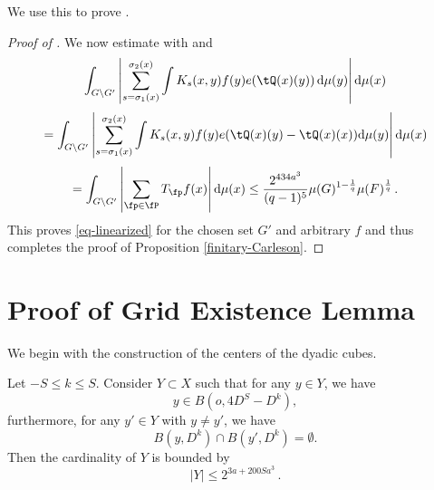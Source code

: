 We use this to prove .
\begin{proof}[Proof of ]
\leanok
We now estimate with  and 
\begin{equation}
 \int_{G \setminus G'} \left|\sum_{s={\sigma_1}(x)}^{{\sigma_2}(x)} \int K_s(x,y) f(y) e(\tQ(x)(y)) \, \mathrm{d}\mu(y)\right| \mathrm{d}\mu(x)
\end{equation}
\begin{equation}
 =\int_{G \setminus G'} \left|\sum_{s={\sigma_1}(x)}^{{\sigma_2}(x)} \int K_s(x,y) f(y) e(\tQ(x)(y) - \tQ(x)(x))\mathrm{d}\mu(y)\right| \mathrm{d}\mu(x)
\end{equation}
\begin{equation}
 =\int_{G \setminus G'} \left|\sum_{\fp\in \fP}T_{\fp} f(x)\right| \mathrm{d}\mu(x)
 \le \frac{2^{434a^3}}{(q-1)^5} \mu(G)^{1 - \frac{1}{q}} \mu(F)^{\frac{1}{q}} \,.
\end{equation}
This proves \eqref{eq-linearized} for the chosen set $G'$ and arbitrary $f$ and thus completes the proof of Proposition
\ref{finitary-Carleson}.
\end{proof}


\section{Proof of Grid Existence Lemma}
\label{subsecdyadic}

We begin with the construction of the centers of the dyadic cubes.
\begin{lemma}
    \label{counting-balls}
    \leanok
    Let $-S\le k\le S$. Consider $Y\subset X$ such that for any $y\in Y$, we have
    \begin{equation}\label{ybinb}
    y\in B(o,4D^S-D^k),
    \end{equation}
    furthermore, for any $y'\in Y$ with $y\neq y'$, we have
    \begin{equation} \label{eq-disj-yballs}
        B(y,D^k)\cap B(y',D^k)=\emptyset.
    \end{equation}
    Then the cardinality of $Y$ is bounded by
    \begin{equation}\label{boundY}
        |Y|\le 2^{3a + 200Sa^3}\, .
    \end{equation}
\end{lemma}


